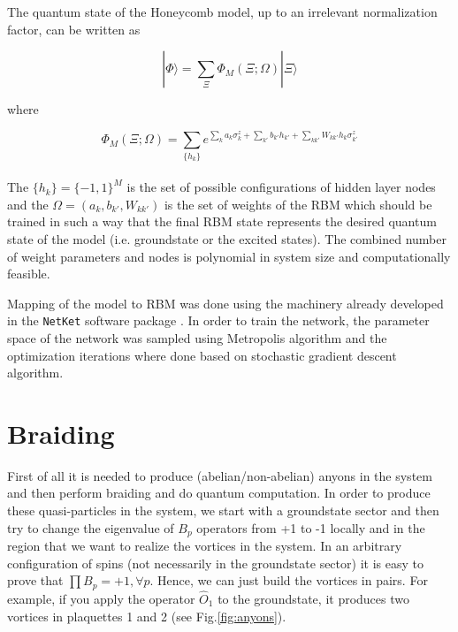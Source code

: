\documentclass{article}
\begin{document}
The quantum state of the Honeycomb model, up to an irrelevant normalization factor, can be written as 

\begin{equation}\label{eq:19_0}
    |\Phi\rangle=\sum_{\Xi}\Phi_{M}(\Xi;\Omega)|\Xi\rangle
\end{equation}{}

where

\begin{equation}\label{eq:19_1}
	\Phi_{M}(\Xi;\Omega) =  \sum_{\{h_{k}\}}e^{\sum_{k}a_{k}\sigma_{k}^{z}+\sum_{k'}b_{k'}h_{k'}+\sum_{kk'}W_{kk'}h_{k}\sigma_{k'}^{z}}
\end{equation}\\

The $\{h_{k}\}=\{-1,1\}^{M}$ is the set of possible configurations of hidden layer nodes and the $\Omega=(a_{k},b_{k'},W_{kk'})$ is the set of weights of the RBM which should be trained in such a way that the final RBM state represents the desired quantum state of the model (i.e. groundstate or the excited states). The combined number of weight parameters and nodes is polynomial in system size and computationally feasible.


Mapping of the model to RBM was done using the machinery already developed in the \texttt{NetKet} software package \cite{netket}. In order to train the network, the parameter space of the network was sampled using Metropolis algorithm and the optimization iterations where done based on stochastic gradient descent algorithm. 

\section{Braiding}

First of all it is needed to produce (abelian/non-abelian) anyons in the system and then perform braiding and do quantum computation. In order to produce these quasi-particles in the system, we start with a groundstate sector and then try to change the eigenvalue of $B_p$ operators from +1 to -1 locally and in the region that we want to realize the vortices in the system. 
In an arbitrary configuration of spins (not necessarily in the groundstate sector) it is easy to prove that $\prod B_p = +1 ,\forall p$. Hence, we can just build the vortices in pairs. For example, if you apply the operator $\hat{O}_1$ to the groundstate, it produces two vortices in plaquettes 1 and 2 (see Fig.\hspace{0.2mm}\ref{fig:anyons}). 
\end{document}
